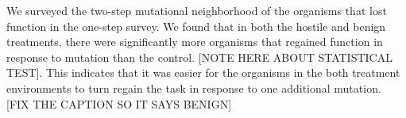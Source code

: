 We surveyed the two-step mutational neighborhood of the organisms that lost function in the one-step survey. We found that in both the hostile and benign treatments, there were significantly more organisms that regained function in response to mutation than the control. [NOTE HERE ABOUT STATISTICAL TEST]. This indicates that it was easier for the organisms in the both treatment environments to turn regain the task in response to one additional mutation.
[FIX THE CAPTION SO IT SAYS BENIGN]
